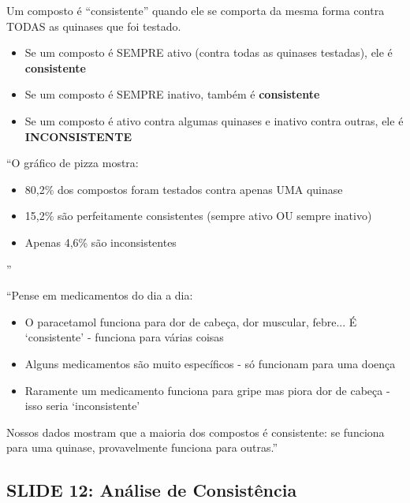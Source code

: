 \documentclass[11pt,a4paper]{article}
\begin{document}
\begin{tcolorbox}[colback=yellow!10, colframe=yellow!50!black, title=\textbf{O que significa consistência?}]
Um composto é ``consistente'' quando ele se comporta da mesma forma contra TODAS as quinases que foi testado.
\begin{itemize}
    \item Se um composto é SEMPRE ativo (contra todas as quinases testadas), ele é \textbf{consistente}
    \item Se um composto é SEMPRE inativo, também é \textbf{consistente}
    \item Se um composto é ativo contra algumas quinases e inativo contra outras, ele é \textbf{INCONSISTENTE}
\end{itemize}
\end{tcolorbox}

\begin{oquedizer}
``O gráfico de pizza mostra:
\begin{itemize}
    \item 80,2\% dos compostos foram testados contra apenas UMA quinase
    \item 15,2\% são perfeitamente consistentes (sempre ativo OU sempre inativo)
    \item Apenas 4,6\% são inconsistentes
\end{itemize}''
\end{oquedizer}

\begin{analogia}
``Pense em medicamentos do dia a dia:
\begin{itemize}
    \item O paracetamol funciona para dor de cabeça, dor muscular, febre... É `consistente' - funciona para várias coisas
    \item Alguns medicamentos são muito específicos - só funcionam para uma doença
    \item Raramente um medicamento funciona para gripe mas piora dor de cabeça - isso seria `inconsistente'
\end{itemize}

Nossos dados mostram que a maioria dos compostos é consistente: se funciona para uma quinase, provavelmente funciona para outras.''
\end{analogia}

\subsection{SLIDE 12: Análise de Consistência}
\end{document}
